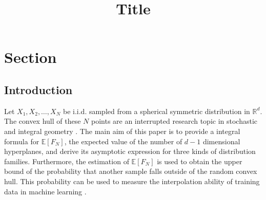 \documentclass{aptpub}
\def\E{\mathbb{E}}
\begin{document}

\title{Title} %




\begin{abstract}
\end{abstract}

\keywords{}%

\ams{}{}%


\section{Section} %


\subsection{Introduction} %
Let $X_1, X_2, \dots, X_N$ be i.i.d. sampled from a spherical symmetric distribution in $\mathbb{R}^d$.
The convex hull of these $N$ points are an interrupted research topic in stochastic and integral geometry
\cite{schneider2008stochastic}.
The main aim of this paper is to provide a integral formula for $\E[F_N]$, the expected value of the number of $d-1$ dimensional hyperplanes,
and derive its asymptotic expression
for three kinds of distribution families. Furthermore, the estimation of $\E[F_N]$ is used to obtain the upper bound
of the probability that another sample falls outside of the random convex hull. This probability can be used to
measure the interpolation ability of training data in machine learning
\cite{balestriero2021learning}.
\end{document}
